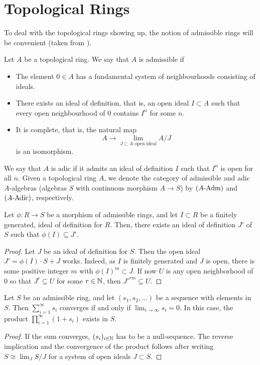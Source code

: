 \documentclass[../main.tex]{subfiles}
\begin{document}
\section{Topological Rings}
To deal with the topological rings showing up, the notion of admissible rings
will be convenient (taken from \cite[Tag 07E8]{stacks-project}).
\begin{defi}\label{def:admring}
  Let $A$ be a topological ring. We say that $A$ is admissible if
  \begin{itemize}
    \item The element $0 \in A$ has a fundamental system of neighbourhoods
      consisting of ideals.
    \item There exists an ideal of definition, that is, an open ideal $I
      \subset A$ such that every open neighbourhood of $0$ contains $I^n$ for
      some $n$.
    \item It is complete, that is, the natural map
      \begin{equation*}
        A \to \lim_{J \subset A \text{ open ideal}} A/J
      \end{equation*}
      is an isomorphism.
  \end{itemize}
  We say that $A$ is adic if it admits an ideal of definition $I$ such that 
  $I^n$ is open for all $n$.
  Given a topological ring $A$, we denote the category of admissible 
  and adic $A$-algebras (algebras $S$ with continuous morphism $A \to S$) by
  ${({A}\text-\allowbreak\mathrm{Adm})}$ and ${({A}\text-\allowbreak\mathrm{Adic})}$, respectively.
\end{defi}


\begin{lem} \label{lem:iodimage}
  Let $\phi: R \to S$ be a morphism of admissible rings, and let $I \subset R$ be a finitely generated, ideal of definition for 
  $R$. Then, there exists an ideal of definition $J'$ of $S$ such that 
  $\phi(I) \subseteq J'$.
\begin{proof}
  Let $J$ be an ideal of definition for $S$. Then the open
  ideal $J' = \phi(I)\cdot S + J$ works. Indeed, as $I$
  is finitely generated and $J$ is open, there is some positive integer $m$ with $\phi(I)^m \subset J$. If now $U$ is any open neighborhood 
  of $0$ so that $J^r \subseteq U$ for some $r \in \mathbb{N}$, then $J'^{rm} \subseteq U$. 
\end{proof}
\end{lem}

\begin{lem}\label{lem:infiniteseriesandproducts}
  Let $S$ be an admissible ring, and let $(s_1, s_2, \dots)$ be a sequence with
  elements in $S$. Then $\sum_{i = 1}^\infty s_i$ converges if and only if 
   $\lim_{i \to \infty} s_i = 0$. In this case, the product $\prod_{i=1}^\infty (1 + s_i)$
   exists in $S$.
\begin{proof}
  If the sum converges, $(s_i)_{i \in \mathbb{N}}$ has to be a null-sequence. The
  reverse implication and the convergence of the product follows after writing
  $S \cong \lim_{J} S/J$ for a system of open ideals $J \subset S$. 
\end{proof}
\end{lem}
\end{document}
